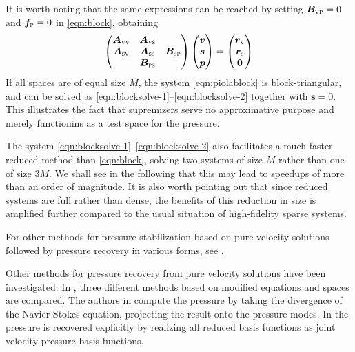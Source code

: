 \documentclass[onecolumn, twoside, a4paper, 11pt]{article}
\begin{document}
It is worth noting that the same expressions can be reached by setting $\bm B_\textsc{vp} = 0$ and
$\bm f_\textsc{p} = 0$ in \eqref{eqn:block}, obtaining
\begin{equation}
  \label{eqn:piolablock}
  \begin{pmatrix}
    \bm A_\textsc{vv} & \bm A_\textsc{vs} & \\
    \bm A_\textsc{sv} & \bm A_\textsc{ss} & \bm B_\textsc{sp} \\
    & \bm B_\textsc{ps} & \end{pmatrix}
  \begin{pmatrix} \bm v \\ \bm s \\ \bm p \end{pmatrix}
  = \begin{pmatrix} \bm r_\textsc{v} \\ \bm r_\textsc{s} \\ \bm 0 \end{pmatrix}
\end{equation}
If all spaces are of equal size $M$, the system \eqref{eqn:piolablock} is
block-triangular, and can be solved as
\eqref{eqn:blocksolve-1}--\eqref{eqn:blocksolve-2} together with $\bm s = 0$.
This illustrates the fact that supremizers serve no approximative purpose and
merely functionins as a test space for the pressure.

The system \eqref{eqn:blocksolve-1}--\eqref{eqn:blocksolve-2} also facilitates a
much faster reduced method than \eqref{eqn:block}, solving two systems of size
$M$ rather than one of size $3M$. We shall see in the following that this may
lead to speedups of more than an order of magnitude. It is also worth pointing out
that since reduced systems are full rather than dense, the benefits of this
reduction in size is amplified further compared to the usual situation of high-fidelity
sparse systems.

For other methods for pressure stabilization based on pure velocity solutions
followed by pressure recovery in various forms, see
\cite{Akhtar2009ser,Caiazzo2014niv,Baiges2013ero}.

Other methods for pressure recovery from pure velocity solutions have been investigated. In
\cite{Caiazzo2014niv}, three different methods based on modified equations and spaces are
compared. The authors in \cite{Akhtar2009ser} compute the pressure by taking the divergence of the
Navier-Stokes equation, projecting the result onto the pressure modes. In \cite{Baiges2013ero} the
pressure is recovered explicitly by realizing all reduced basis functions as joint velocity-pressure
basis functions.
\end{document}

